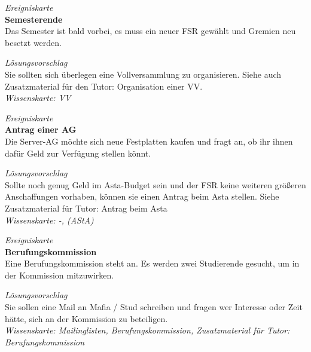 \documentclass[a4paper,11pt]{scrartcl} %
\begin{document}
\begin{framed}
\textit{Ereigniskarte} \\

\textbf{Semesterende} \\
Das Semester ist bald vorbei, es muss ein neuer FSR gewählt und 
Gremien neu besetzt werden.
\end{framed}

\begin{framed}
\textit{Lösungsvorschlag} \\

Sie sollten sich überlegen eine Vollversammlung zu organisieren.
Siehe auch Zusatzmaterial für den Tutor: Organisation einer VV.\\

\textit{Wissenskarte: VV}
\end{framed}


\begin{framed}
\textit{Ereigniskarte} \\

\textbf{Antrag einer AG} \\
Die Server-AG möchte sich neue Festplatten kaufen und fragt an, 
ob ihr ihnen dafür Geld zur Verfügung stellen könnt.
\end{framed}

\begin{framed}
\textit{Lösungsvorschlag} \\

Sollte noch genug Geld im Asta-Budget sein und der FSR keine weiteren 
größeren Anschaffungen vorhaben, können sie einen Antrag beim
Asta stellen. Siehe Zusatzmaterial für Tutor: Antrag beim Asta \\

\textit{Wissenskarte: -, (AStA)}
\end{framed}

\begin{framed}
\textit{Ereigniskarte} \\

\textbf{Berufungskommission} \\
Eine Berufungskommission steht an. Es werden zwei Studierende gesucht, um 
in der Kommission mitzuwirken.
\end{framed}

\begin{framed}
\textit{Lösungsvorschlag} \\

Sie sollen eine Mail an Mafia / Stud schreiben und fragen wer Interesse oder 
Zeit hätte, sich an der Kommission zu beteiligen. \\

\textit{Wissenskarte: Mailinglisten, Berufungskommission, 
Zusatzmaterial für Tutor: Berufungskommission}
\end{framed}
\end{document}

